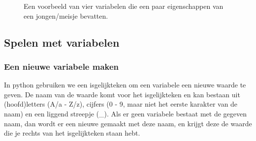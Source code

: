 \begin{figure}[H]
	\centering
	\begin{subfigure}[b]{.2\textwidth}
		\centering
		\caption{}
		\label{variabelsExample1.name}
	\end{subfigure}
	\begin{subfigure}[b]{.2\textwidth}
		\centering
		\caption{}
		\label{variabelsExample1.age}
	\end{subfigure}
	\begin{subfigure}[b]{.2\textwidth}
		\centering
		\caption{}
		\label{variabelsExample1.outdoorPlayer}
	\end{subfigure}
	\begin{subfigure}[b]{.2\textwidth}
		\centering
		\caption{}
		\label{variabelsExample1.company}
	\end{subfigure}
	\caption{
		Een voorbeeld van vier variabelen die een paar eigenschappen van een jongen/meisje bevatten.
	}
\end{figure}

\subsection{Spelen met variabelen}

\subsubsection{Een nieuwe variabele maken}

In python gebruiken we een isgelijkteken \pySnip{=} om een variabele een nieuwe waarde te geven.
De naam van de waarde komt voor het isgelijkteken en kan bestaan uit
(hoofd)letters (A/a - Z/z), cijfers (0 - 9, maar niet het eerste karakter van de naam) en een liggend streepje (\_).
Als er geen variabele bestaat met de gegeven naam, dan wordt er een nieuwe gemaakt met deze naam,
en krijgt deze de waarde die je rechts van het isgelijkteken staan hebt.

